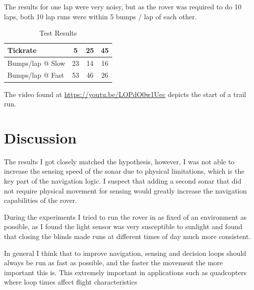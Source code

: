 \documentclass[a4paper,12pt,twocolumn]{report}
\begin{document}
The results for one lap were very noisy, but as the rover was required to do 10 laps, both 10 lap runs were within 5 bumps / lap of each other.

\begin{table}
\centering
\caption{Test Results}
\label{my-label}
\begin{tabular}{|l|c|c|c|}
\hline
Tickrate         & 5  & 25 & 45 \\ \hline
Bumps/lap @ Slow & 23 & 14 & 16 \\ \hline
Bumps/lap @ Fast & 53 & 46 & 26 \\ \hline
\end{tabular}
\end{table}

The video found at \url{https://youtu.be/LOPdO0w1Uec} depicts the start of a trail run.

\section{Discussion}


The results I got closely matched the hypothesis, however, I was not able to increase the sensing speed of the sonar due to physical limitations, which is the key part of the navigation logic. I suspect that adding a second sonar that did not require physical movement for sensing would greatly increase the navigation capabilities of the rover.

During the experiments I tried to run the rover in as fixed of an environment as possible, as I found the light sensor was very susceptible to sunlight and found that closing the blinds made runs at different times of day much more consistent.

In general I think that to improve navigation, sensing and decision loops should always be run as fast as possible, and the faster the movement the more important this is. This extremely important in applications such as quadcopters where loop times affect flight characteristics \citep{betaflight}
\end{document}
